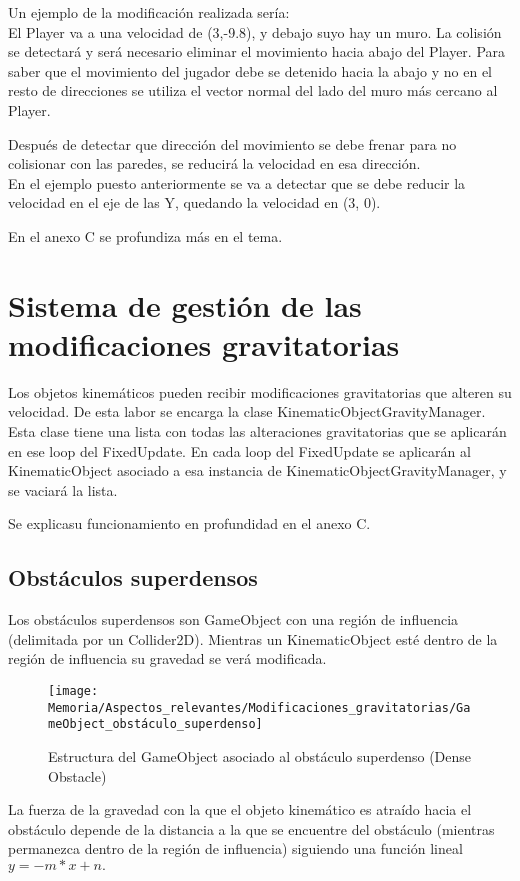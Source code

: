 Un ejemplo de la modificación realizada sería:\\
El Player va a una velocidad de (3,-9.8), y debajo suyo hay un muro. La colisión se detectará y será necesario eliminar el movimiento hacia abajo del Player. Para saber que el movimiento del jugador debe se detenido hacia la abajo y no en el resto de direcciones se utiliza el vector normal del lado del muro más cercano al Player.

Después de detectar que dirección del movimiento se debe frenar para no colisionar con las paredes, se reducirá la velocidad en esa dirección.\\
En el ejemplo puesto anteriormente se va a detectar que se debe reducir la velocidad en el eje de las Y, quedando la velocidad en (3, 0).

En el anexo C se profundiza más en el tema.

\section{Sistema de gestión de las modificaciones gravitatorias}
Los objetos kinemáticos pueden recibir modificaciones gravitatorias que alteren su velocidad. De esta labor se encarga la clase KinematicObjectGravityManager.\\
Esta clase tiene una lista con todas las alteraciones gravitatorias que se aplicarán en ese loop del FixedUpdate. En cada loop del FixedUpdate se aplicarán al KinematicObject asociado a esa instancia de KinematicObjectGravityManager, y se vaciará la lista.

Se explicasu funcionamiento en profundidad en el anexo C.

\subsection{Obstáculos superdensos}
Los obstáculos superdensos son GameObject con una región de influencia (delimitada por un Collider2D). Mientras un KinematicObject esté dentro de la región de influencia su gravedad se verá modificada.

\begin{figure}[h]
\centering
\texttt{[image: Memoria/Aspectos\_relevantes/Modificaciones\_gravitatorias/GameObject\_obstáculo\_superdenso]}
\caption{Estructura del GameObject asociado al obstáculo superdenso (Dense Obstacle)}
\end{figure}

La fuerza de la gravedad con la que el objeto kinemático es atraído hacia el obstáculo depende de la distancia a la que se encuentre del obstáculo (mientras permanezca dentro de la región de influencia) siguiendo una función lineal $y=-m*x+n.$


